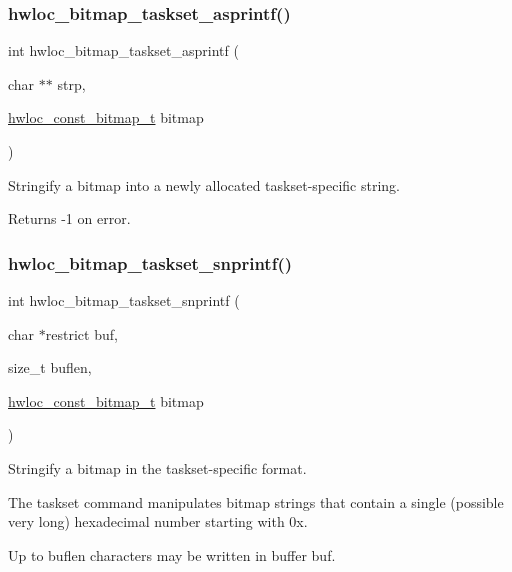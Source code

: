 \subsubsection{\texorpdfstring{hwloc\+\_\+bitmap\+\_\+taskset\+\_\+asprintf()}{hwloc\_bitmap\_taskset\_asprintf()}}
{\footnotesize\ttfamily int hwloc\+\_\+bitmap\+\_\+taskset\+\_\+asprintf (\begin{DoxyParamCaption}\item[{char $\ast$$\ast$}]{strp,  }\item[{\hyperlink{a00205_gae991a108af01d408be2776c5b2c467b2}{hwloc\+\_\+const\+\_\+bitmap\+\_\+t}}]{bitmap }\end{DoxyParamCaption})}



Stringify a bitmap into a newly allocated taskset-\/specific string. 

\begin{DoxyReturn}{Returns}
-\/1 on error. 
\end{DoxyReturn}
\mbox{\label{a00205_ga5beb68a987fe48e5c5edef06ab260e14}} 
\subsubsection{\texorpdfstring{hwloc\+\_\+bitmap\+\_\+taskset\+\_\+snprintf()}{hwloc\_bitmap\_taskset\_snprintf()}}
{\footnotesize\ttfamily int hwloc\+\_\+bitmap\+\_\+taskset\+\_\+snprintf (\begin{DoxyParamCaption}\item[{char $\ast$restrict}]{buf,  }\item[{size\+\_\+t}]{buflen,  }\item[{\hyperlink{a00205_gae991a108af01d408be2776c5b2c467b2}{hwloc\+\_\+const\+\_\+bitmap\+\_\+t}}]{bitmap }\end{DoxyParamCaption})}



Stringify a bitmap in the taskset-\/specific format. 

The taskset command manipulates bitmap strings that contain a single (possible very long) hexadecimal number starting with 0x.

Up to {\ttfamily buflen} characters may be written in buffer {\ttfamily buf}.

